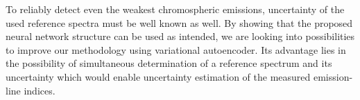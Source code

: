 To reliably detect even the weakest chromospheric emissions, uncertainty of the used reference spectra must be well known as well. By showing that the proposed neural network structure can be used as intended, we are looking into possibilities to improve our methodology using variational autoencoder. Its advantage lies in the possibility of simultaneous determination of a reference spectrum and its uncertainty which would enable uncertainty estimation of the measured emission-line indices.

